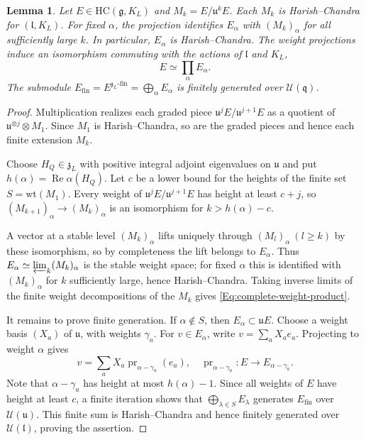 \documentclass[a4paper,12pt]{amsart}
\numberwithin{equation}{section}
\theoremstyle{plain}
\newtheorem{lemma}[theorem]{Lemma}
\theoremstyle{definition}
\theoremstyle{remark}
\newcommand{\HC}{\mathrm{HC}}
\begin{document}
\begin{lemma}\label{L:complete-weights}
Let $E\in\HC(\mathfrak g,K_L)$ and $M_k=E/\mathfrak u^kE$.
Each $M_k$ is Harish--Chandra for $(\mathfrak l,K_L)$.
For fixed $\alpha$, the projection identifies $E_\alpha$ with $(M_k)_\alpha$ for all sufficiently large $k$.
In particular, $E_\alpha$ is Harish--Chandra.
The weight projections induce an isomorphism commuting with the actions of $\mathfrak l$ and $K_L$,
\begin{equation}\label{Eq:complete-weight-product}
 E\simeq\prod_\alpha E_\alpha .
\end{equation}
The submodule $E_{\mathrm{fin}}=E^{\mathfrak z_L\text{-fin}}=\bigoplus_\alpha E_\alpha$ is finitely generated over $\mathcal U(\mathfrak q)$.
\end{lemma}
\begin{proof}
Multiplication realizes each graded piece $\mathfrak u^jE/\mathfrak u^{j+1}E$ as a quotient of $\mathfrak u^{\otimes j}\otimes M_1$.
Since $M_1$ is Harish--Chandra, so are the graded pieces and hence each finite extension $M_k$.

Choose $H_Q\in\mathfrak z_L$ with positive integral adjoint eigenvalues on $\mathfrak u$ and put $h(\alpha)=\operatorname{Re}\alpha(H_Q)$.
Let $c$ be a lower bound for the heights of the finite set $S=\mathrm{wt}(M_1)$.
Every weight of $\mathfrak u^jE/\mathfrak u^{j+1}E$ has height at least $c+j$, so $(M_{k+1})_\alpha\to(M_k)_\alpha$ is an isomorphism for $k>h(\alpha)-c$.

A vector at a stable level $(M_k)_\alpha$ lifts uniquely through $(M_l)_\alpha\ (l\geq k)$ by these isomorphism, so by completeness the lift belongs to $E_\alpha$.
Thus $E_\alpha\simeq \varprojlim_k (M_k)_\alpha$ is the stable weight space; for fixed $\alpha$ this is identified with $(M_k)_\alpha$ for $k$ sufficiently large, hence Harish--Chandra.
Taking inverse limits of the finite weight decompositions of the $M_k$ gives \eqref{Eq:complete-weight-product}.

It remains to prove finite generation.
If $\alpha\notin S$, then $E_\alpha\subset\mathfrak uE$.
Choose a weight basis $(X_a)$ of $\mathfrak u$, with weights $\gamma_a$.
For $v\in E_\alpha$, write $v=\sum_a X_ae_a$.
Projecting to weight $\alpha$ gives
\[
 v=\sum_a X_a\operatorname{pr}_{\alpha-\gamma_a}(e_a),\quad \operatorname{pr}_{\alpha-\gamma_a}:E\to E_{\alpha-\gamma_a}.
\]
Note that $\alpha-\gamma_a$ has height at most $h(\alpha)-1$.
Since all weights of $E$ have height at least $c$, a finite iteration shows that $\bigoplus_{\lambda\in S}E_\lambda$ generates $E_{\mathrm{fin}}$ over $\mathcal U(\mathfrak u)$.
This finite sum is Harish--Chandra and hence finitely generated over $\mathcal U(\mathfrak l)$, proving the assertion.
\end{proof}
\end{document}
